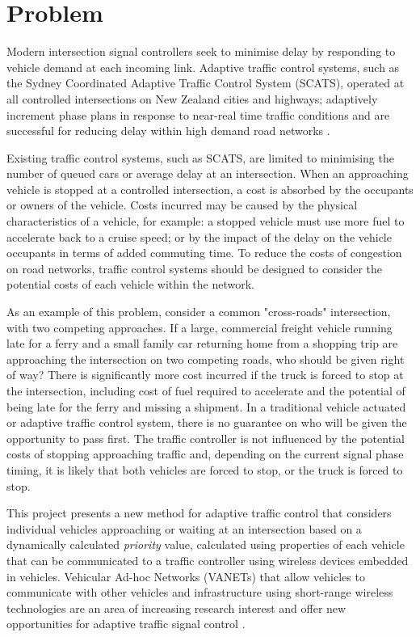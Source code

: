 \section{Problem}

Modern intersection signal controllers seek to minimise delay by responding to vehicle demand at each incoming link. Adaptive traffic control systems, such as the Sydney Coordinated Adaptive Traffic Control System (SCATS), operated at all controlled intersections on New Zealand cities and highways; adaptively increment phase plans in response to near-real time traffic conditions and are successful for reducing delay within high demand road networks \cite{lowrie1982scats,akcelik1998evaluation,wolshon1999scats}.

Existing traffic control systems, such as SCATS, are limited to minimising the number of queued cars or average delay at an intersection. When an approaching vehicle is stopped at a controlled intersection, a cost is absorbed by the occupants or owners of the vehicle. Costs incurred may be caused by the physical characteristics of a vehicle, for example: a stopped vehicle must use more fuel to accelerate back to a cruise speed; or by the impact of the delay on the vehicle occupants in terms of added commuting time. To reduce the costs of congestion on road networks, traffic control systems should be designed to consider the potential costs of each vehicle within the network.

As an example of this problem, consider a common "cross-roads" intersection, with two competing approaches. If a large, commercial freight vehicle running late for a ferry and a small family car returning home from a shopping trip are approaching the intersection on two competing roads, who should be given right of way? There is significantly more cost incurred if the truck is forced to stop at the intersection, including cost of fuel required to accelerate and the potential of being late for the ferry and missing a shipment. In a traditional vehicle actuated or adaptive traffic control system, there is no guarantee on who will be given the opportunity to pass first. The traffic controller is not influenced by the potential costs of stopping approaching traffic and, depending on the current signal phase timing, it is likely that both vehicles are forced to stop, or the truck is forced to stop. 

This project presents a new method for adaptive traffic control that considers individual vehicles approaching or waiting at an intersection based on a dynamically calculated \emph{priority} value, calculated using properties of each vehicle that can be communicated to a traffic controller using wireless devices embedded in vehicles. Vehicular Ad-hoc Networks (VANETs) that allow vehicles to communicate with other vehicles and infrastructure using short-range wireless technologies are an area of increasing research interest and offer new opportunities for adaptive traffic signal control \cite{adaptive2007grad,nadeem2004trafficview,yang2004vehicle}.

